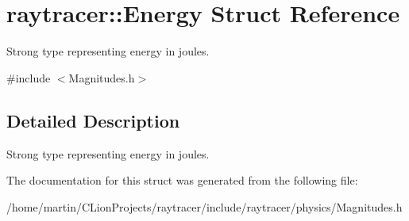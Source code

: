 \hypertarget{structraytracer_1_1Energy}{}\section{raytracer\+:\+:Energy Struct Reference}
\label{structraytracer_1_1Energy}


Strong type representing energy in joules.  




{\ttfamily \#include $<$Magnitudes.\+h$>$}



\subsection{Detailed Description}
Strong type representing energy in joules. 



The documentation for this struct was generated from the following file\+:\begin{DoxyCompactItemize}
\item 
/home/martin/\+C\+Lion\+Projects/raytracer/include/raytracer/physics/Magnitudes.\+h\end{DoxyCompactItemize}

